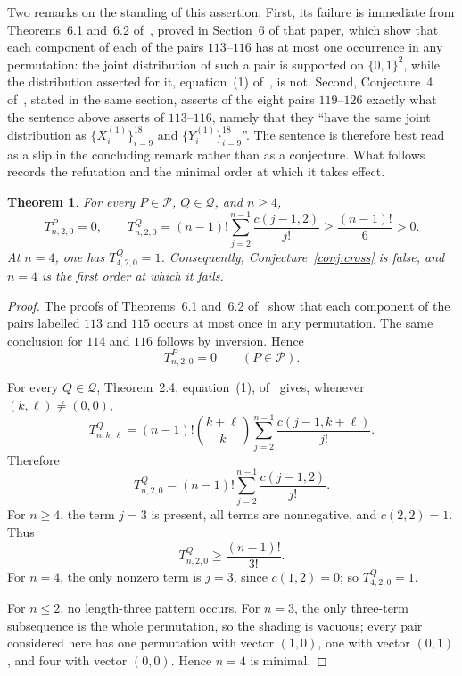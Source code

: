 \documentclass[11pt]{amsart}
\newtheorem{theorem}{Theorem}
\theoremstyle{plain}
\theoremstyle{remark}
\begin{document}
Two remarks on the standing of this assertion. First, its failure is
immediate from Theorems~6.1 and~6.2 of~\cite{LvZhang}, proved in
Section~6 of that paper, which show that each component of each of the
pairs $113$--$116$ has at most one occurrence in any permutation: the
joint distribution of such a pair is supported on $\{0,1\}^2$, while
the distribution asserted for it, equation~(1) of~\cite{LvZhang}, is
not. Second, Conjecture~4 of~\cite{LvZhang}, stated in the same
section, asserts of the eight pairs $119$--$126$ exactly what the
sentence above asserts of $113$--$116$, namely that they ``have the
same joint distribution as $\{X^{(1)}_i\}_{i=9}^{18}$ and
$\{Y^{(1)}_i\}_{i=9}^{18}$''. The sentence is therefore best read as a
slip in the concluding remark rather than as a conjecture. What follows
records the refutation and the minimal order at which it takes effect.

\begin{theorem}
For every $P\in\mathcal P$, $Q\in\mathcal Q$, and $n\ge4$,
\[
T^P_{n,2,0}=0,
\qquad
T^Q_{n,2,0}
=
(n-1)!\sum_{j=2}^{n-1}\frac{c(j-1,2)}{j!}
\ge \frac{(n-1)!}{6}>0.
\]
At $n=4$, one has $T^Q_{4,2,0}=1$. Consequently,
Conjecture~\ref{conj:cross} is false, and $n=4$ is the first
order at which it fails.
\end{theorem}

\begin{proof}
The proofs of Theorems~6.1 and~6.2 of~\cite{LvZhang} show that each
component of the pairs labelled $113$ and $115$ occurs at most once
in any permutation. The same conclusion for $114$ and $116$ follows
by inversion. Hence
\[
T^P_{n,2,0}=0
\qquad(P\in\mathcal P).
\]

For every $Q\in\mathcal Q$, Theorem~2.4, equation~(1),
of~\cite{LvZhang} gives, whenever $(k,\ell)\ne(0,0)$,
\[
T^Q_{n,k,\ell}
=
(n-1)!\binom{k+\ell}{k}
\sum_{j=2}^{n-1}\frac{c(j-1,k+\ell)}{j!}.
\]
Therefore
\[
T^Q_{n,2,0}
=
(n-1)!\sum_{j=2}^{n-1}\frac{c(j-1,2)}{j!}.
\]
For $n\ge4$, the term $j=3$ is present, all terms are nonnegative,
and $c(2,2)=1$. Thus
\[
T^Q_{n,2,0}
\ge
\frac{(n-1)!}{3!}.
\]
For $n=4$, the only nonzero term is $j=3$, since $c(1,2)=0$; so
$T^Q_{4,2,0}=1$.

For $n\le2$, no length-three pattern occurs. For $n=3$, the only
three-term subsequence is the whole permutation, so the shading is
vacuous; every pair considered here has one permutation with vector
$(1,0)$, one with vector $(0,1)$, and four with vector $(0,0)$.
Hence $n=4$ is minimal.
\end{proof}
\end{document}
